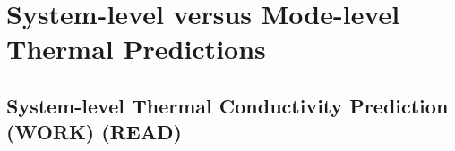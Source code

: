 \section{\label{S-SystemMode}
System-level versus Mode-level Thermal Predictions}

\subsection{\label{S-ktopdown} 
System-level Thermal Conductivity Prediction (WORK) (READ)}

